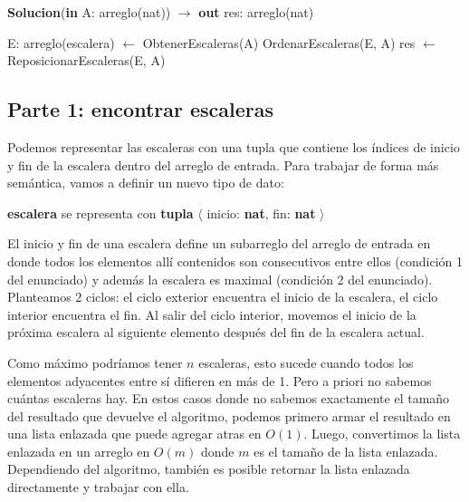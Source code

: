 \begin{algorithm}[H]
\caption{
    \textbf{Solucion}(\textbf{in} A: arreglo(nat)) $\to$ \textbf{out} res: arreglo(nat)
}
\begin{algorithmic}[1]
    \State E: arreglo(escalera) $\gets$ ObtenerEscaleras(A) 
    \State OrdenarEscaleras(E, A) 
    \State res $\gets$ ReposicionarEscaleras(E, A) 
\end{algorithmic}
\end{algorithm}

\subsection*{Parte 1: encontrar escaleras}


Podemos representar las escaleras con una tupla que contiene los índices de inicio y fin de la escalera dentro del arreglo de entrada. Para trabajar de forma más semántica, vamos a definir un nuevo tipo de dato:

\textbf{escalera} se representa con \textbf{tupla} $\langle$ inicio: \textbf{nat}, fin: \textbf{nat} $\rangle$


El inicio y fin de una escalera define un subarreglo del arreglo de entrada en donde todos los elementos allí contenidos son consecutivos entre ellos (condición 1 del enunciado) y además la escalera es maximal (condición 2 del enunciado). Planteamos 2 ciclos: el ciclo exterior encuentra el inicio de la escalera, el ciclo interior encuentra el fin. Al salir del ciclo interior, movemos el inicio de la próxima escalera al siguiente elemento después del fin de la escalera actual.


Como máximo podríamos tener $n$ escaleras, esto sucede cuando todos los elementos adyacentes entre sí difieren en más de 1. Pero a priori no sabemos cuántas escaleras hay. En estos casos donde no sabemos exactamente el tamaño del resultado que devuelve el algoritmo, podemos primero armar el resultado en una lista enlazada que puede agregar atras en $O(1)$. Luego, convertimos la lista enlazada en un arreglo en $O(m)$ donde $m$ es el tamaño de la lista enlazada. Dependiendo del algoritmo, también es posible retornar la lista enlazada directamente y trabajar con ella.

